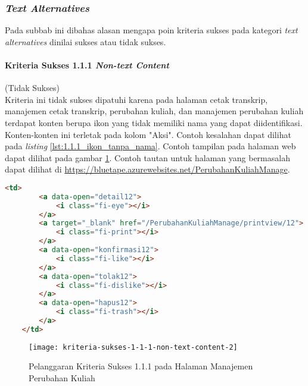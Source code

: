 \subsubsection{\textit{Text Alternatives}}
\label{subsubsec:kepatuhan_bluetape_text_alternatives}
Pada subbab ini dibahas alasan mengapa poin kriteria sukses pada kategori \textit{text alternatives} dinilai sukses atau tidak sukses.

\paragraph{Kriteria Sukses 1.1.1 \textit{Non-text Content}}
\label{par:kepatuhan_bluetape_kriteria_sukses_1.1.1}
(Tidak Sukses)\\

Kriteria ini tidak sukses dipatuhi karena pada halaman cetak transkrip, manajemen cetak transkrip, perubahan kuliah, dan manajemen perubahan kuliah terdapat konten berupa ikon yang tidak memiliki nama yang dapat diidentifikasi. Konten-konten ini terletak pada kolom "Aksi". Contoh kesalahan dapat dilihat pada \textit{listing} \ref{lst:1.1.1_ikon_tanpa_nama}. Contoh tampilan pada halaman web dapat dilihat pada gambar \ref{fig:1.1.1_non_text_content_2}. Contoh tautan untuk halaman yang bermasalah dapat dilihat di \url{https://bluetape.azurewebsites.net/PerubahanKuliahManage}.
\begin{lstlisting}[frame=single, label={lst:1.1.1_ikon_tanpa_nama}, language=HTML, caption=Pelanggaran Kriteria Sukses 1.1.1 pada Halaman Manajemen Perubahan Kuliah]
    <td>
        <a data-open="detail12">
            <i class="fi-eye"></i>
        </a>
        <a target="_blank" href="/PerubahanKuliahManage/printview/12">
            <i class="fi-print"></i>
        </a>
        <a data-open="konfirmasi12">
            <i class="fi-like"></i>
        </a>  
        <a data-open="tolak12">
            <i class="fi-dislike"></i>
        </a>
        <a data-open="hapus12">
            <i class="fi-trash"></i>
        </a>
    </td>
\end{lstlisting}

\begin{figure}[H]
    \centering  
    \texttt{[image: kriteria-sukses-1-1-1-non-text-content-2]}  
    \caption[Pelanggaran Kriteria Sukses 1.1.1 pada Halaman Manajemen Perubahan Kuliah]{Pelanggaran Kriteria Sukses 1.1.1 pada Halaman Manajemen Perubahan Kuliah}
    \label{fig:1.1.1_non_text_content_2}  
\end{figure} 

